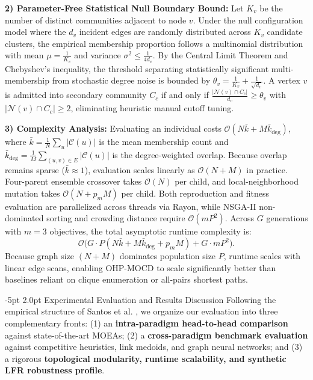 \documentclass{svproc}
\makeatletter
\renewcommand\section{\@startsection{section}{1}{\z@}%
  {-5pt \@plus -1pt \@minus -0.5pt}%
  {2.0pt \@plus 0.5pt}%
  {\normalfont\large\bfseries\boldmath}}
\makeatother
\begin{document}
\noindent\textbf{2) Parameter-Free Statistical Null Boundary Bound:} Let $K_v$ be the number of distinct communities adjacent to node $v$. Under the null configuration model where the $d_v$ incident edges are randomly distributed across $K_v$ candidate clusters, the empirical membership proportion follows a multinomial distribution with mean $\mu = \frac{1}{K_v}$ and variance $\sigma^2 \le \frac{1}{4 d_v}$. By the Central Limit Theorem and Chebyshev's inequality, the threshold separating statistically significant multi-membership from stochastic degree noise is bounded by $\theta_v = \frac{1}{K_v} + \frac{1}{\sqrt{d_v}}$. A vertex $v$ is admitted into secondary community $C_c$ if and only if $\frac{|\mathcal{N}(v) \cap C_c|}{d_v} \ge \theta_v$ with $|\mathcal{N}(v) \cap C_c| \ge 2$, eliminating heuristic manual cutoff tuning.

\noindent\textbf{3) Complexity Analysis:} Evaluating an individual costs $\mathcal{O}(N\bar{k} + M\bar{k}_{\deg})$, where $\bar{k} = \frac{1}{N}\sum_u |\mathcal{C}(u)|$ is the mean membership count and $\bar{k}_{\deg} = \frac{1}{M}\sum_{(u,v)\in E} |\mathcal{C}(u)|$ is the degree-weighted overlap. Because overlap remains sparse ($\bar{k} \approx 1$), evaluation scales linearly as $\mathcal{O}(N + M)$ in practice. Four-parent ensemble crossover takes $\mathcal{O}(N)$ per child, and local-neighborhood mutation takes $\mathcal{O}(N + p_m M)$ per child. Both reproduction and fitness evaluation are parallelized across threads via Rayon, while NSGA-II non-dominated sorting and crowding distance require $\mathcal{O}(mP^2)$. Across $G$ generations with $m = 3$ objectives, the total asymptotic runtime complexity is:
\begin{equation}\label{eq:complexity}
\mathcal{O}\Big( G \cdot P(N\bar{k} + M\bar{k}_{\deg} + p_m M) + G \cdot m P^2 \Big).
\end{equation}
Because graph size $(N + M)$ dominates population size $P$, runtime scales with linear edge scans, enabling OHP-MOCD to scale significantly better than baselines reliant on clique enumeration or all-pairs shortest paths.

\section{Experimental Evaluation and Results Discussion}\label{sec:experiments}
Following the empirical structure of Santos et al. \cite{santos2025}, we organize our evaluation into three complementary fronts: (1) an \textbf{intra-paradigm head-to-head comparison} against state-of-the-art MOEAs; (2) a \textbf{cross-paradigm benchmark evaluation} against competitive heuristics, link medoids, and graph neural networks; and (3) a rigorous \textbf{topological modularity, runtime scalability, and synthetic LFR robustness profile}.
\end{document}
